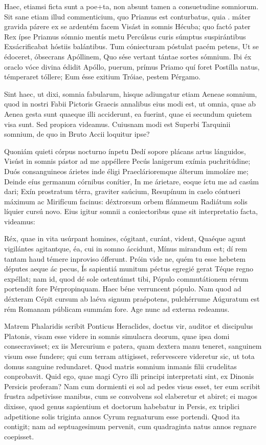  Haec, etiamsi ficta sunt a poe+ta, non absunt tamen a consuetudine somniorum. Sit sane etiam illud commenticium, quo Priamus est conturbatus, quia . máter gravida párere ex se ardentém facem Visást in somnis Hécuba; quo factó pater Rex ípse Priamus sómnio mentís metu Percúlsus curis súmptus suspirántibus Exsácrificabat hóstiis balántibus. Tum cóniecturam póstulat pacém petens, Ut se édoceret, óbsecrans Apóllinem, Quo sése vertant tántae sortes sómnium. Ibi éx oraclo vóce divina édidit Apóllo, puerum, prímus Priamo quí foret Postílla natus, témperaret tóllere; Eum ésse exitium Tróiae, pestem Pérgamo.

 Sint haec, ut dixi, somnia fabularum, hisque adiungatur etiam Aeneae somnium, quod in nostri Fabii Pictoris Graecis annalibus eius modi est, ut omnia, quae ab Aenea gesta sunt quaeque illi acciderunt, ea fuerint, quae ei secundum quietem visa sunt. Sed propiora videamus. Cuiusnam modi est Superbi Tarquinii somnium, de quo in Bruto Accii loquitur ipse?

 Quoniám quieti córpus nocturno ínpetu Dedí sopore plácans artus lánguidos, Visúst in somnis pástor ad me appéllere Pecús lanigerum exímia puchritúdine; Duós consanguineos árietes inde éligi Praeclárioremque álterum immoláre me; Deinde eíus germanum córnibus conítier, In me árietare, eoque íctu me ad casúm dari; Exín prostratum térra, graviter saúcium, Resupínum in caelo cóntueri máximum ac Mirifícum facinus: déxtrorsum orbem flámmeum Radiátum solis líquier cursú novo. Eius igitur somnii a coniectoribus quae sit interpretatio facta, videamus:

 Réx, quae in vita usúrpant homines, cógitant, curánt, vident, Quaéque agunt vigilántes agitantque, éa, cui in somno áccidunt, Mínus mirandum est; dí rem tantam haud témere inproviso ófferunt. Próin vide ne, quém tu esse hebetem députes aeque ác pecus, Ís sapientiá munitum péctus egregié gerat Téque regno expéllat; nam id, quod dé sole ostentúmst tibi, Pópulo commutátionem rérum portendít fore Pérpropinquam. Haec béne verruncent pópulo. Nam quod ad déxteram Cépit cursum ab laéva signum praépotens, pulchérrume Aúguratum est rém Romanam públicam summám fore. Age nunc ad externa redeamus.

 Matrem Phalaridis scribit Ponticus Heraclides, doctus vir, auditor et discipulus Platonis, visam esse videre in somnis simulacra deorum, quae ipsa domi consecravisset; ex iis Mercurium e patera, quam dextera manu teneret, sanguinem visum esse fundere; qui cum terram attigisset, refervescere videretur sic, ut tota domus sanguine redundaret. Quod matris somnium inmanis filii crudelitas conprobavit. Quid ego, quae magi Cyro illi principi interpretati sint, ex Dinonis Persicis proferam? Nam cum dormienti ei sol ad pedes visus esset, ter eum scribit frustra adpetivisse manibus, cum se convolvens sol elaberetur et abiret; ei magos dixisse, quod genus sapientium et doctorum habebatur in Persis, ex triplici adpetitione solis triginta annos Cyrum regnaturum esse portendi. Quod ita contigit; nam ad septuagesimum pervenit, cum quadraginta natus annos regnare coepisset.

